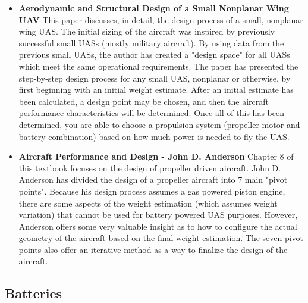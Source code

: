 \documentclass{article}
\begin{document}
\begin{itemize}

\item {\bf Aerodynamic and Structural Design of a Small Nonplanar Wing UAV} \cite{Lan08} This paper discusses, in detail, the design process of a small, nonplanar wing UAS. The initial sizing of the aircraft was inspired by previously successful small UASs (mostly military aircraft).  By using data from the previous small UASs, the author has created a "design space" for all UASs which meet the same operational requirements.  The paper has presented the step-by-step design process for any small UAS, nonplanar or otherwise, by first beginning with an initial weight estimate.  After an initial estimate has been calculated, a design point may be chosen, and then the aircraft performance characteristics will be determined.  Once all of this has been determined, you are able to choose a propulsion system (propeller motor and battery combination) based on how much power is needed to fly the UAS. 

\item {\bf Aircraft Performance and Design - John D. Anderson} \cite{And99} Chapter 8 of this textbook focuses on the design of propeller driven aircraft.  John D. Anderson has divided the design of a propeller aircraft into 7 main "pivot points".  Because his design process assumes a gas powered piston engine, there are some aspects of the weight estimation (which assumes weight variation) that cannot be used for battery powered UAS purposes.  However, Anderson offers some very valuable insight as to how to configure the actual geometry of the aircraft based on the final weight estimation.  The seven pivot points also offer an iterative method as a way to finalize the design of the aircraft.

\end{itemize}

\subsection{Batteries}
\end{document}
